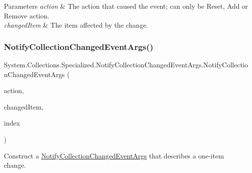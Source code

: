 \begin{DoxyParams}{Parameters}
{\em action} & The action that caused the event; can only be Reset, Add or Remove action.\\
\hline
{\em changed\+Item} & The item affected by the change.\\
\hline
\end{DoxyParams}
\mbox{\label{class_system_1_1_collections_1_1_specialized_1_1_notify_collection_changed_event_args_adc1dee1f065384489aa2b47b03251763}} 
\subsubsection{\texorpdfstring{Notify\+Collection\+Changed\+Event\+Args()}{NotifyCollectionChangedEventArgs()}\hspace{0.1cm}{\footnotesize\ttfamily [3/11]}}
{\footnotesize\ttfamily System.\+Collections.\+Specialized.\+Notify\+Collection\+Changed\+Event\+Args.\+Notify\+Collection\+Changed\+Event\+Args (\begin{DoxyParamCaption}\item[{\hyperlink{namespace_system_1_1_collections_1_1_specialized_a7e21ea761562ed22011c3120bbb31123}{Notify\+Collection\+Changed\+Action}}]{action,  }\item[{object}]{changed\+Item,  }\item[{int}]{index }\end{DoxyParamCaption})\hspace{0.3cm}{\ttfamily [inline]}}



Construct a \hyperlink{class_system_1_1_collections_1_1_specialized_1_1_notify_collection_changed_event_args}{Notify\+Collection\+Changed\+Event\+Args} that describes a one-\/item change. 


